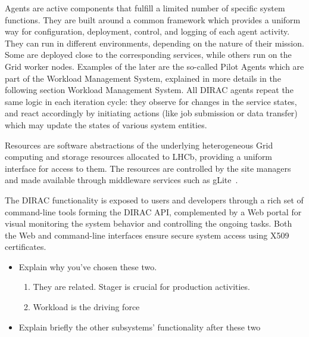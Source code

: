 \documentclass{IEEEtran}
\begin{document}
Agents are active components that fulfill a limited number of specific
system functions. They are built around a common framework which provides
a uniform way for configuration, deployment, control, and logging of each
agent activity.  They can run in different environments, depending on the
nature of their mission. Some are deployed close to the corresponding
services, while others run on the Grid worker nodes.  Examples of the
later are the so-called Pilot Agents which are part of the Workload
Management System, explained in more details in the following section
Workload Management System. All DIRAC agents repeat the same logic in
each iteration cycle: they observe for changes in the service states,
and react accordingly by initiating actions (like job submission or data
transfer) which may update the states of various system entities.

Resources are software abstractions of the underlying heterogeneous
Grid computing and storage resources allocated to LHCb, providing a
uniform interface for access to them. The resources are controlled by
the site managers and made available through middleware services such
as gLite~\cite{XXX}.

The DIRAC functionality is exposed to users and developers through a
rich set of command-line tools forming the DIRAC API, complemented by a
Web portal for visual monitoring the system behavior and controlling the
ongoing tasks. Both the Web and command-line interfaces ensure secure
system access using X509 certificates.

\begin{itemize}
\item Explain why you’ve chosen these two. 
\begin{enumerate} 
\item They are related. Stager is crucial for production activities. 
\item Workload is the driving force
\end{enumerate}
\item Explain briefly the other subsystems’ functionality after these two
\end{itemize}




\end{document}

